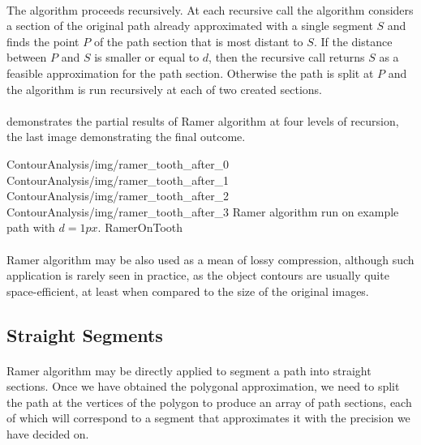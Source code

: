 \paragraph*{}
The algorithm proceeds recursively. At each recursive call the algorithm considers a section of the original path already approximated with a single segment $S$ and finds the point $P$ of the path section that is most distant to $S$. If the distance between $P$ and $S$ is smaller or equal to $d$, then the recursive call returns $S$ as a feasible approximation for the path section. Otherwise the path is split at $P$ and the algorithm is run recursively at each of two created sections.

\paragraph*{}
 demonstrates the partial results of Ramer algorithm at four levels of recursion, the last image demonstrating the final outcome.

\fourFigures
{ContourAnalysis/img/ramer_tooth_after_0}
{ContourAnalysis/img/ramer_tooth_after_1}
{ContourAnalysis/img/ramer_tooth_after_2}
{ContourAnalysis/img/ramer_tooth_after_3}
{Ramer algorithm run on example path with $d = 1px$.}
{RamerOnTooth}
{\basicWidth}

\paragraph*{}
Ramer algorithm may be also used as a mean of lossy compression, although such application is rarely seen in practice, as the object contours are usually quite space-efficient, at least when compared to the size of the original images.

\subsection{Straight Segments}

\paragraph*{}
Ramer algorithm may be directly applied to segment a path into straight sections. Once we have obtained the polygonal approximation, we need to split the path at the vertices of the polygon to produce an array of path sections, each of which will correspond to a segment that approximates it with the precision we have decided on.

